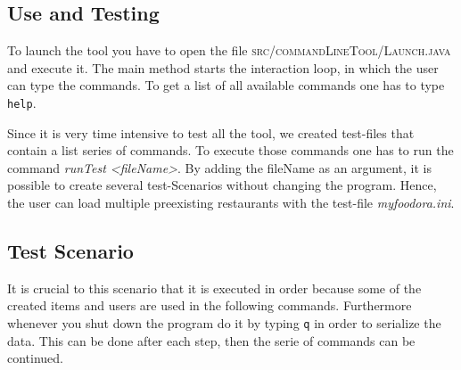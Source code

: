 \subsection{Use and Testing}
\label{sub:use_and_testing}

To launch the tool you have to open the file \textsc{src/commandLineTool/Launch.java} and execute
it. The main method starts the interaction loop, in which the user can type the commands. To get
a list of all available commands one has to type \lstinline|help|. 

Since it is very time intensive to test all the tool, we created test-files that
contain a list series of commands. To execute those commands one has to run the command 
\textit{runTest <fileName>}. By adding the fileName as an argument, it is possible to create 
several test-Scenarios without changing the program. Hence, the user can load multiple 
preexisting restaurants with the test-file \textit{my\textunderscore foodora.ini}.

\subsection{Test Scenario}
\label{sub:test_scenario}

It is crucial to this scenario that it is executed in order because some of the created items and 
users are used in the following commands. Furthermore whenever you shut down the program do it by
typing \lstinline|q| in order to serialize the data. This can be done after each step, then the 
serie of commands can be continued.

